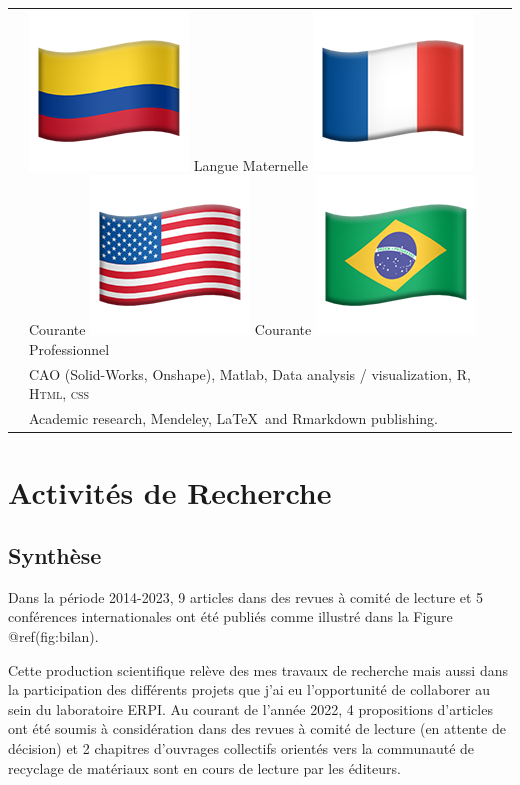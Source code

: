 \documentclass[
  11pt,
]{article}
\begin{document}
\extrarowsep=3pt
\begin{tabu} to \linewidth {X[0.1,l] X[2,l]}

  & 
\includegraphics[width=2ex]{Figures/icons/flag-colombia.png} Langue Maternelle\quad 
\includegraphics[width=2ex]{Figures/icons/flag-france.png} Courante  \quad\includegraphics[width=2ex]{Figures/icons/flag-usa.png} Courante  \quad
\includegraphics[width=2ex]{Figures/icons/flag-brazil.png} Professionnel \\[5pt] 


  & CAO (Solid-Works, Onshape), Matlab,  Data analysis / visualization, R, \textsc{Html, css} \\[5pt]
    

  & Academic research,  Mendeley, \LaTeX ~and Rmarkdown publishing.

\end{tabu}

\hypertarget{activituxe9s-de-recherche}{%
\section{Activités de Recherche}\label{activituxe9s-de-recherche}}

\hypertarget{synthuxe8se}{%
\subsection{Synthèse}\label{synthuxe8se}}

Dans la période 2014-2023, 9 articles dans des revues à comité de
lecture et 5 conférences internationales ont été publiés comme illustré
dans la Figure @ref(fig:bilan).

Cette production scientifique relève des mes travaux de recherche mais
aussi dans la participation des différents projets que j'ai eu
l'opportunité de collaborer au sein du laboratoire ERPI. Au courant de
l'année 2022, 4 propositions d'articles ont été soumis à considération
dans des revues à comité de lecture (en attente de décision) et 2
chapitres d'ouvrages collectifs orientés vers la communauté de recyclage
de matériaux sont en cours de lecture par les éditeurs.
\end{document}
